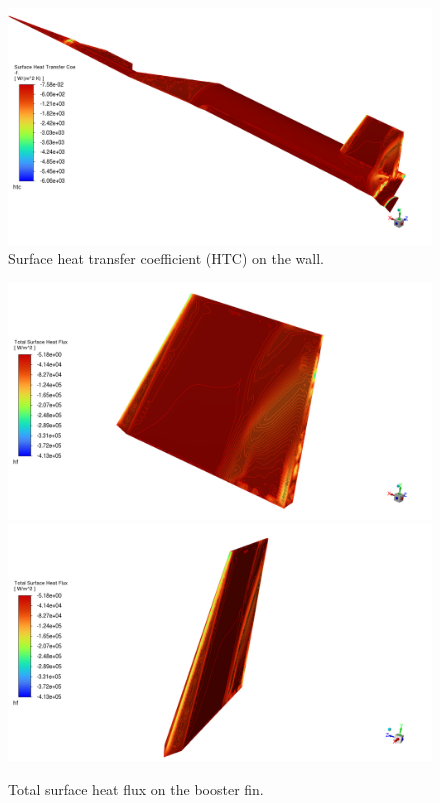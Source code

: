 \documentclass[12pt]{article}
\begin{document}
\begin{figure}[H] %
    \centering
    \includegraphics[width=\linewidth]{figs/t136s/t136s_M5p26_jetONVernierON_FULL-HTC.png}
    \caption{Surface heat transfer coefficient (HTC) on the wall.}
    \label{fig:t136s_htc_onon}
\end{figure}

\begin{figure}[H] %
    \centering
    \includegraphics[width=0.495\linewidth]{figs/t136s/t136s_M5p26_jetONVernierON_FIN-HF.png}
    \includegraphics[width=0.495\linewidth]{figs/t136s/t136s_M5p26_jetONVernierON_FIN2-HF.png}
    \caption{Total surface heat flux on the booster fin.}
    \label{fig:t136s_fin_hf_onon}
\end{figure}
\end{document}
